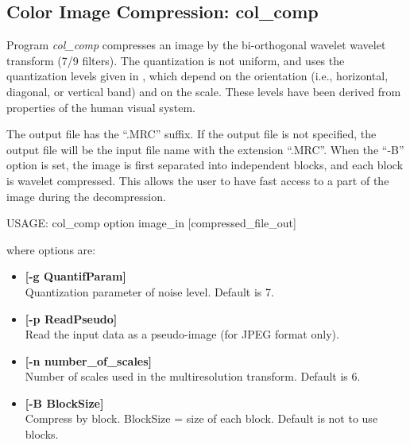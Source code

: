 \subsection{Color Image Compression: col\_comp}
Program {\em col\_comp} compresses an 
image by the bi-orthogonal wavelet wavelet transform (7/9 filters).
The quantization is not uniform, and uses the quantization levels
given in \cite{compress:watson97}, which depend on the orientation 
(i.e., horizontal, diagonal, or vertical band) and on the scale. These
levels have been derived from properties of the human visual system. 

The output file has the ``.MRC'' suffix. If the output file
 is not specified,  the output file will be the
 input file name with the extension ``.MRC''. When the ``-B'' option is set,
 the image is first separated into independent blocks, and each block 
 is wavelet compressed. This allows the user to have fast access to
 a part of the image during the decompression.
{\bf
\begin{center}
 USAGE: col\_comp option image\_in [compressed\_file\_out]
\end{center}}
where options are:
\begin{itemize}     
\baselineskip=0.4truecm
\itemsep=0.1truecm
\item {\bf [-g QuantifParam]}  \\
Quantization parameter of noise level. Default is 7.
\item {\bf [-p ReadPseudo]} \\
Read the input data as a pseudo-image (for JPEG format only).
\item {\bf [-n number\_of\_scales]}  \\
Number of scales used in the multiresolution transform. Default is 6.
\item {\bf [-B BlockSize]} \\
Compress by block. BlockSize = size of each block.
Default is not to use blocks.
\end{itemize}

